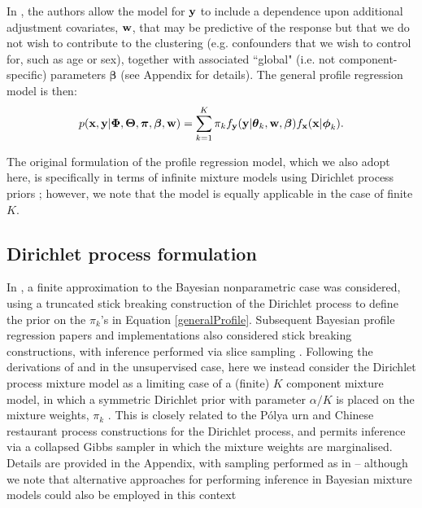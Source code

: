 \documentclass[12pt]{article}
\begin{document}
In \citet{Molitor2010}, the authors allow the model for ${\bf y}$ to include a dependence upon additional adjustment covariates, ${\bf w}$, that may be predictive of the response but that we do not wish to contribute to the clustering (e.g. confounders that we wish to control for, such as age or sex), together with associated ``global" (i.e. not component-specific) parameters $\boldsymbol{ \beta}$ (see Appendix for details).  The general profile regression model is then:
\begin{align}
p({\bf x}, {\bf y}|\boldsymbol{\Phi}, \boldsymbol{\Theta}, \boldsymbol{\pi}, \boldsymbol{\beta}, {\bf w}) = \sum_{k=1}^K \pi_k f_{\bf y}({\bf y}|\boldsymbol{\theta}_k, {\bf w}, \boldsymbol{ \beta})f_{\bf x}({\bf x}|\boldsymbol{\phi}_k).\label{generalProfile}
\end{align}

The original formulation of the profile regression model, which we also adopt here, is specifically in terms of infinite mixture models using Dirichlet process priors \citep{Molitor2010}; however, we note that the model is equally applicable in the case of finite $K$.

\subsection{Dirichlet process formulation}
In \citet{Molitor2010}, a finite approximation to the Bayesian nonparametric case was considered, using a truncated stick breaking construction of the Dirichlet process \citep{Ishwaran2001} to define the prior on the $\pi_k$'s in Equation \eqref{generalProfile}.  Subsequent Bayesian profile regression papers \citep{Hastie2014} and implementations \citep{Liverani2015} also considered stick breaking constructions, with inference performed via slice sampling \citep{Walker2007,Kalli2011}.  Following the derivations of \citet{Neal2000} and \citet{Rasmussen2000} in the unsupervised case, here we instead consider the Dirichlet process mixture model as a limiting case of a (finite) $K$ component mixture model, in which a symmetric Dirichlet prior with parameter $\alpha/K$ is placed on the mixture weights, $\pi_k$ \citep[see also][]{Ishwaran2002}.  This is closely related to the P\'{o}lya urn \citep{Blackwell1973} and Chinese restaurant process \citep{Aldous1985} constructions for the Dirichlet process, and permits inference via a collapsed Gibbs sampler in which the mixture weights are marginalised.  Details are provided in the Appendix, with sampling performed as in \citet{Neal2000} -- although we note that alternative approaches for performing inference in Bayesian mixture models could also be employed in this context \citep[e.g.][]{Richardson1997,Green:2001,Jain:2004,Jain:2007,Walker2007,Kalli2011,Miller:2017} %
\end{document}
